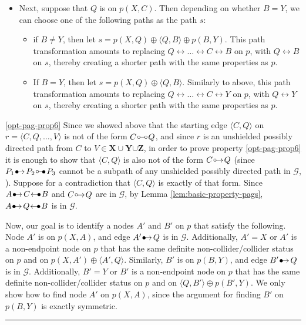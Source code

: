 \documentclass[twoside]{article}
\newcommand{\mb}[1]{\mathbf{#1}}
\newcommand{\g}[1][G]{\mathcal{#1}}
\newenvironment{proofof}[1][]{\begin{trivlist}
\item[\hskip \labelsep {\bfseries Proof of #1.}]}{\hfill\BlackBox\end{trivlist}}
\newcommand{\BlackBox}{\rule{1.5ex}{1.5ex}}
\newcommand{\circbullet}{
  \setlength{\unitlength}{1mm}
  \begin{picture}(5,1)(0,0)
    \put(1,1){\circle{1}}
    \put(1.5,1){\line(1,0){2.4}}
    \put(2.9,0){$\bullet$}
  \end{picture}
}
\newcommand{\bulletarrow}{
  \setlength{\unitlength}{1mm}
  \begin{picture}(5,1)(0,0)
    \put(0.2,0){$\bullet$}
    \put(1,0){$\rightarrow$}
  \end{picture}
}
\newcommand{\arrowbullet}{
  \setlength{\unitlength}{1mm}
  \begin{picture}(5,1)(0,0)
    \put(0.2,0){$\leftarrow$}
    \put(3,0){$\bullet$}
  \end{picture}
}
\newcommand{\circarrow}{
  \setlength{\unitlength}{1mm}
  \begin{picture}(5,1)(0,0)
    \put(1,1){\circle{1}}
    \put(1.2,0){$\rightarrow$}
  \end{picture}
}
\newcommand{\circcirc}{
  \setlength{\unitlength}{1mm}
  \begin{picture}(5,1)(0,0)
    \put(1,1){\circle{1}}
    \put(1.5,1){\line(1,0){2}}
    \put(4,1){\circle{1}}
  \end{picture}
}
\begin{document}
\begin{proofof}[Lemma \ref{lem:adjust-and-o-pag-helper}]
\begin{itemize}
        \item Next, suppose that $Q$ is on $p(X,C)$. Then depending  on whether  $B = Y$, we can choose one of the following paths as the path $s$:
        \begin{itemize}
            \item  if $B \neq Y$, then let $s = p(X,Q) \oplus \langle Q,B \rangle \oplus p(B,Y) $. This path transformation amounts to replacing  $Q \leftrightarrow \dots \leftrightarrow C \leftrightarrow B$ on $p$, with $Q \leftrightarrow B$ on $s$, thereby creating a shorter path  with the same properties as $p$. 
            \item If $B = Y$, then let $s= p(X,Q) \oplus \langle Q,B \rangle$.  Similarly to above, this path transformation amounts to replacing  $Q \leftrightarrow \dots \leftrightarrow C \leftrightarrow Y$ on $p$, with $Q \leftrightarrow Y$ on $s$, thereby creating a shorter path  with the same properties as $p$. 
        \end{itemize}
    \end{itemize}

    \ref{opt-pag-prop6} Since we showed above that the starting edge $\langle C, Q \rangle$ on $r = \langle C,Q, \dots, V \rangle$ is not of the form $C \circcirc Q$, and since $r$ is an unshielded possibly directed path from $C$ to $V \in \mb{X} \cup \mb{Y} {\cup \mb{Z}}$, in order to prove property \ref{opt-pag-prop6} it is enough to show that $\langle C, Q \rangle$ is also not of the form $C \circarrow Q$ (since $P_1 \bulletarrow P_2 \circbullet P_3$ cannot be a subpath of any unshielded possibly directed path in $\g$, \citealp{zhang2008completeness}). Suppose for a contradiction that $\langle C,Q\rangle$ is exactly of that form. Since $A \bulletarrow C \arrowbullet B$ and $C \circarrow Q$ are in $\g$, by Lemma \ref{lem:basic-property-pags}, $A \bulletarrow Q \arrowbullet B$ is in $\g$. 
    
    Now, our goal is to identify a nodes $A'$ and $B'$ on $p$ that satisfy the following. Node $A'$ is on $p(X,A)$, and edge $A' \bulletarrow Q$ is in $\g$. Additionally, $A' = X$ or $A'$ is a non-endpoint node on $p$ that has the same definite non-collider/collider status on $p$ and on $p(X,A') \oplus \langle A', Q \rangle$. Similarly, $B'$ is on $p(B,Y)$, and edge $B' \bulletarrow Q$ is in $\g$. Additionally, $B' = Y$ or $B'$ is a non-endpoint node on $p$ that has the same definite non-collider/collider status on $p$ and on $\langle Q, B' \rangle \oplus p(B',Y)$. We only show how to find node $A'$ on $p(X,A)$, since the argument for finding $B'$ on $p(B,Y)$ is exactly symmetric.
    

\end{proofof}
\end{document}
